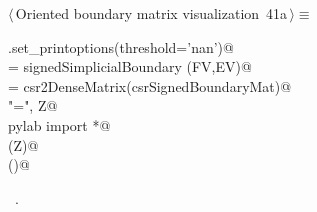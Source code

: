 \documentclass[11pt,oneside]{article}	%
\begin{document}
\begin{flushleft} \small \label{scrap85}
\protect{}$\langle\,$Oriented boundary matrix visualization\nobreak\ {\footnotesize 41a}$\,\rangle\equiv$
\vspace{-1ex}
\begin{list}{}{} \item
\mbox{}\verb@np.set_printoptions(threshold='nan')@\\
\mbox{}\verb@csrSignedBoundaryMat = signedSimplicialBoundary (FV,EV)@\\
\mbox{}\verb@Z = csr2DenseMatrix(csrSignedBoundaryMat)@\\
\mbox{}\verb@print "\ncsrSignedBoundaryMat =\n", Z@\\
\mbox{}\verb@from pylab import *@\\
\mbox{}\verb@matshow(Z)@\\
\mbox{}\verb@show()@\\
\mbox{}\verb@@{\NWsep}
\end{list}
\vspace{-1ex}
\footnotesize\addtolength{\baselineskip}{-1ex}
\begin{list}{}{\setlength{\itemsep}{-\parsep}\setlength{\itemindent}{-\leftmargin}}
\item \NWtxtMacroRefIn\ .
\end{list}
\end{flushleft}
\end{document}
